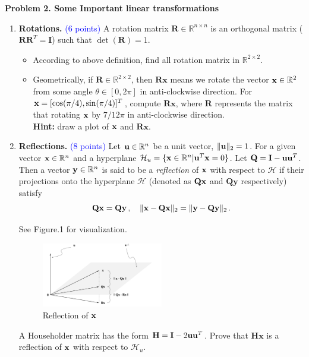\documentclass[english,onecolumn]{IEEEtran}
\begin{document}
\noindent\textbf{Problem 2. Some Important linear transformations}
\begin{enumerate}
	\item \textbf{Rotations.} \textcolor{blue}{(6 points)}
	A rotation matrix $\mathbf{R}\in\mathbb{R}^{n\times n}$ is an orthogonal matrix ($\mathbf{R}\mathbf{R}^T=\mathbf{I}$) such that $\det({\mathbf{R}})=1$.
	\begin{itemize}
		\item According to above definition, find all rotation matrix in $\mathbb{R}^{2\times 2}$.  
		\item Geometrically, if $\mathbf{R}\in\mathbb{R}^{2\times 2}$, then $\mathbf{Rx}$ means we rotate the vector ${\bf x}\in\mathbb{R}^2$ from some angle $\theta\in[0,2\pi]$ in anti-clockwise direction. 
		For ${\bf x}=[\cos(\pi/4), \sin(\pi/4)]^T$, compute $\mathbf{Rx}$, where $\mathbf{R}$ represents the matrix that rotating ${\bf x}$ by $7/12\pi$ in anti-clockwise direction. \\
		\textbf{Hint:} draw a plot of ${\bf x}$ and $\mathbf{Rx}$.
	\end{itemize} 
	\item \textbf{Reflections.} \textcolor{blue}{(8 points)}
	 Let ${\bf u}\in\mathbb{R}^n$ be a unit vector, $ \|{\bf u}\|_2=1$. For a given vector ${\bf x}\in\mathbb{R}^n$ and a hyperplane $\mathcal{H}_u=\{ {\bf x}\in\mathbb{R}^n| {\bf u}^T{\bf x}=0\}$.
	Let $\mathbf{Q} = {\bf I}-{\bf uu}^T$.
	Then a vector ${\bf y}\in\mathbb{R}^n$ is said to be a \emph{reflection} of ${\bf x}$ with respect to $\mathcal{H}$ if their projections onto the hyperplane $\mathcal{H}$ (denoted as $\mathbf{Q}{\bf x}$ and $\mathbf{Qy}$ respectively) satisfy 
	\[
	\mathbf{Q}{\bf x}=\mathbf{Qy}\,,\quad \|{\bf x}-\mathbf{Qx}\|_2=\|{\bf y}-\mathbf{Qy}\|_2\,.
	\]
	
	See Figure.1 for visualization.
	
	\begin{figure}[h]
		\centering
		\includegraphics[width=0.5\textwidth]{reflection.png}
		\caption{Reflection of ${\bf x}$} 
	\end{figure}
	
	A Householder matrix has the form $\mathbf{H} = \mathbf{I} -2{\bf uu}^T$.
	Prove that $\mathbf{Hx}$ is a reflection of ${\bf x}$ with respect to $\mathcal{H}_u$. 
\end{enumerate}
\end{document}
